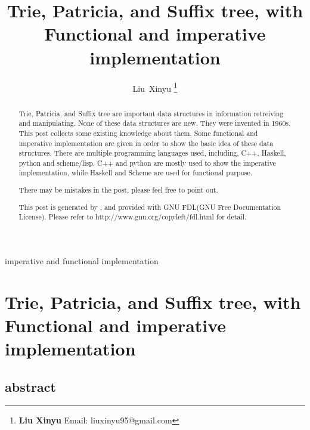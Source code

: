 \documentclass{article}
\begin{document}
\fi


\title{Trie, Patricia, and Suffix tree, with Functional and imperative implementation}

\author{Liu~Xinyu
\thanks{{\bfseries Liu Xinyu } \newline
  Email: liuxinyu95@gmail.com \newline}
  }

{imperative and functional implementation}

\maketitle

\ifx\wholebook\relax
\chapter{Trie, Patricia, and Suffix tree, with Functional and imperative implementation}

\section{abstract}
\else
\begin{abstract}
\fi
Trie, Patricia, and Suffix tree are important data structures in
information retreiving and manipulating. None of these data structures
are new. They were invented in 1960s. This post collects some
existing knowledge about them. Some functional and imperative
implementation are given in order to show the basic idea of these data structures.
There are multiple programming languages used, including, C++, Haskell, python and scheme/lisp.
C++ and python are mostly used to show the imperative implementation, while Haskell and Scheme are
used for functional purpose.

There may be mistakes in the post, please feel free to point out.

This post is generated by \LaTeXe, and provided with GNU FDL(GNU Free Documentation License).
Please refer to http://www.gnu.org/copyleft/fdl.html for detail.

\ifx\wholebook\relax\else
\end{abstract}
\fi
\end{document}
